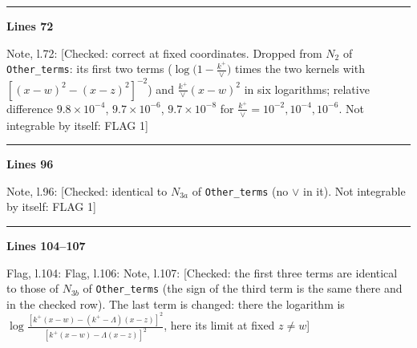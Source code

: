 \documentclass[10pt]{article}
\newenvironment{notebox}{\def\FrameCommand{{\color{notebar}\vrule width 1.5pt}\hspace{6pt}}\MakeFramed{\advance\hsize-\width\FrameRestore}\small}{\endMakeFramed}
\begin{document}
\noindent\rule{\linewidth}{0.3pt}\par\noindent\textbf{Lines 72}\par
\begin{notebox}\textsf{\small Note, l.72:} [Checked: correct at fixed coordinates. Dropped from $N_{2}$ of \texttt{Other\_terms}: its first two terms ($\log\big(1-\frac{k^{+}}{\vee}\big)$ times the two kernels with $[(x-w)^{2}-(x-z)^{2}]^{-2}$) and $\frac{k^{+}}{\vee}(x-w)^{2}$ in six logarithms; relative difference $9.8\times10^{-4}$, $9.7\times10^{-6}$, $9.7\times10^{-8}$ for $\frac{k^{+}}{\vee}=10^{-2},10^{-4},10^{-6}$. Not integrable by itself: FLAG 1]\end{notebox}
\noindent\rule{\linewidth}{0.3pt}\par\noindent\textbf{Lines 96}\par
\begin{notebox}\textsf{\small Note, l.96:} [Checked: identical to $N_{3a}$ of \texttt{Other\_terms} (no $\vee$ in it). Not integrable by itself: FLAG 1]\end{notebox}
\noindent\rule{\linewidth}{0.3pt}\par\noindent\textbf{Lines 104--107} \par
\begin{notebox}\textsf{\small Flag, l.104:} \end{notebox}
\begin{notebox}\textsf{\small Flag, l.106:} \end{notebox}
\begin{notebox}\textsf{\small Note, l.107:} [Checked: the first three terms are identical to those of $N_{3b}$ of \texttt{Other\_terms} (the sign of the third term is the same there and in the checked row). The last term is changed: there the logarithm is $\log\frac{[k^{+}(x-w)-(k^{+}-\Lambda)(x-z)]^{2}}{[k^{+}(x-w)-\Lambda(x-z)]^{2}}$, here its limit at fixed $z\neq w$]\end{notebox}
\end{document}

